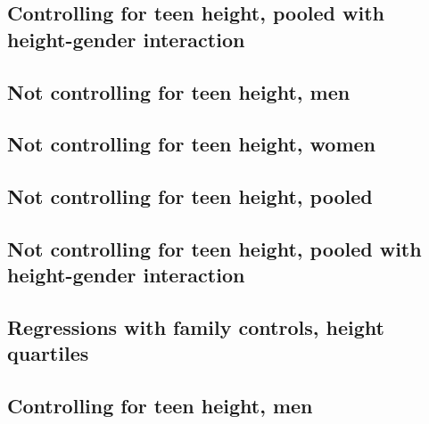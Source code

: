 \documentclass{article}
\begin{document}
\begin{landscape}
\subsection{Controlling for teen height, pooled with height-gender interaction}

\end{landscape}

\begin{landscape}
\subsection{Not controlling for teen height, men}

\end{landscape}

\begin{landscape}
\subsection{Not controlling for teen height, women}

\end{landscape}

\begin{landscape}
\subsection{Not controlling for teen height, pooled}

\end{landscape}

\begin{landscape}
\subsection{Not controlling for teen height, pooled with height-gender interaction}

\end{landscape}

\begin{landscape}
\section{Regressions with family controls, height quartiles}
\subsection{Controlling for teen height, men}

\end{landscape}
\end{document}

